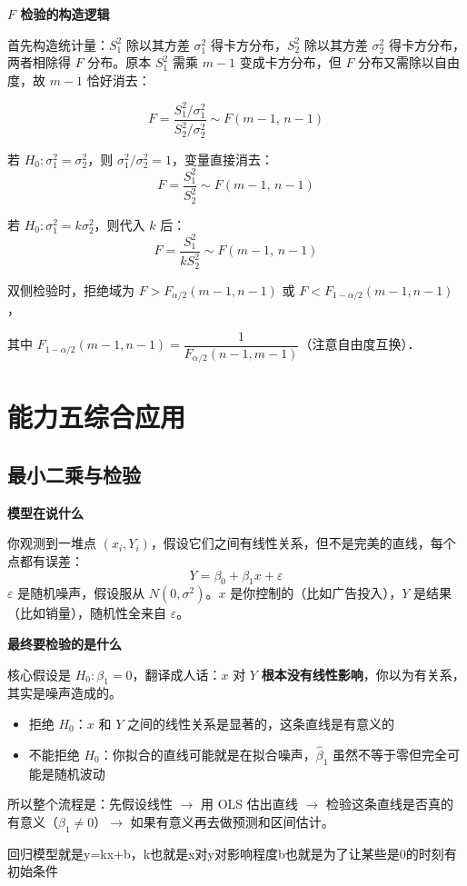 \begin{note}
\textbf{$F$ 检验的构造逻辑}

首先构造统计量：$S_1^2$ 除以其方差 $\sigma_1^2$ 得卡方分布，$S_2^2$ 除以其方差 $\sigma_2^2$ 得卡方分布，两者相除得 $F$ 分布。原本 $S_1^2$ 需乘 $m-1$ 变成卡方分布，但 $F$ 分布又需除以自由度，故 $m-1$ 恰好消去：

$$F = \frac{S_1^2/\sigma_1^2}{S_2^2/\sigma_2^2} \sim F(m-1,\, n-1)$$

若 $H_0: \sigma_1^2 = \sigma_2^2$，则 $\sigma_1^2/\sigma_2^2 = 1$，变量直接消去：
$$F = \frac{S_1^2}{S_2^2} \sim F(m-1,\, n-1)$$

若 $H_0: \sigma_1^2 = k\sigma_2^2$，则代入 $k$ 后：
$$F = \frac{S_1^2}{kS_2^2} \sim F(m-1,\, n-1)$$

双侧检验时，拒绝域为 $F > F_{\alpha/2}(m-1,n-1)$ 或 $F < F_{1-\alpha/2}(m-1,n-1)$，

其中 $F_{1-\alpha/2}(m-1,n-1) = \dfrac{1}{F_{\alpha/2}(n-1,m-1)}$（注意自由度互换）．
\end{note}
\chapter{能力五综合应用}
\section{最小二乘与检验}
\begin{note}
\textbf{模型在说什么}

你观测到一堆点 $(x_i, Y_i)$，假设它们之间有线性关系，但不是完美的直线，每个点都有误差：
\[
Y = \beta_0 + \beta_1 x + \varepsilon
\]
$\varepsilon$ 是随机噪声，假设服从 $N(0,\sigma^2)$。$x$ 是你控制的（比如广告投入），$Y$ 是结果（比如销量），随机性全来自 $\varepsilon$。

\textbf{最终要检验的是什么}

核心假设是 $H_0: \beta_1 = 0$，翻译成人话：$x$ 对 $Y$ \textbf{根本没有线性影响}，你以为有关系，其实是噪声造成的。
\begin{itemize}
  \item 拒绝 $H_0$：$x$ 和 $Y$ 之间的线性关系是显著的，这条直线是有意义的
  \item 不能拒绝 $H_0$：你拟合的直线可能就是在拟合噪声，$\hat{\beta}_1$ 虽然不等于零但完全可能是随机波动
\end{itemize}

所以整个流程是：先假设线性 $\to$ 用 OLS 估出直线 $\to$ 检验这条直线是否真的有意义（$\beta_1 \neq 0$）$\to$ 如果有意义再去做预测和区间估计。
\end{note}
\begin{dxtips}
    回归模型就是y=kx+b，k也就是x对y对影响程度b也就是为了让某些是0的时刻有初始条件
\end{dxtips}

